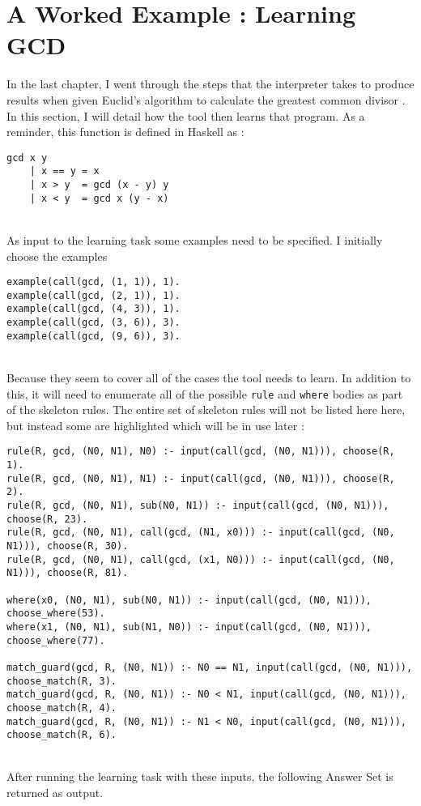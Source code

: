 \section{A Worked Example : Learning GCD}
In the last chapter, I went through the steps that the interpreter takes to produce results when given Euclid's algorithm to calculate the greatest common divisor \cite{Euclid}. In this section, I will detail how the tool then learns that program. As a reminder, this function is defined in Haskell as :

\begin{lstlisting}
gcd x y
	| x == y = x
	| x > y	 = gcd (x - y) y
	| x < y	 = gcd x (y - x)
\end{lstlisting}
\mbox{}\\
As input to the learning task some examples need to be specified. I initially choose the examples \\

\begin{lstlisting}
example(call(gcd, (1, 1)), 1).
example(call(gcd, (2, 1)), 1).
example(call(gcd, (4, 3)), 1).
example(call(gcd, (3, 6)), 3).
example(call(gcd, (9, 6)), 3).
\end{lstlisting}
\mbox{}\\
Because they seem to cover all of the cases the tool needs to learn. In addition to this, it will need to enumerate all of the possible \lstinline{rule} and \lstinline{where} bodies as part of the skeleton rules. The entire set of skeleton rules will not be listed here here, but instead some are highlighted which will be in use later : \\

\begin{lstlisting}
rule(R, gcd, (N0, N1), N0) :- input(call(gcd, (N0, N1))), choose(R, 1).
rule(R, gcd, (N0, N1), N1) :- input(call(gcd, (N0, N1))), choose(R, 2).
rule(R, gcd, (N0, N1), sub(N0, N1)) :- input(call(gcd, (N0, N1))), choose(R, 23).
rule(R, gcd, (N0, N1), call(gcd, (N1, x0))) :- input(call(gcd, (N0, N1))), choose(R, 30).
rule(R, gcd, (N0, N1), call(gcd, (x1, N0))) :- input(call(gcd, (N0, N1))), choose(R, 81).

where(x0, (N0, N1), sub(N0, N1)) :- input(call(gcd, (N0, N1))), choose_where(53).
where(x1, (N0, N1), sub(N1, N0)) :- input(call(gcd, (N0, N1))), choose_where(77).

match_guard(gcd, R, (N0, N1)) :- N0 == N1, input(call(gcd, (N0, N1))), choose_match(R, 3).
match_guard(gcd, R, (N0, N1)) :- N0 < N1, input(call(gcd, (N0, N1))), choose_match(R, 4).
match_guard(gcd, R, (N0, N1)) :- N1 < N0, input(call(gcd, (N0, N1))), choose_match(R, 6).
\end{lstlisting}
\mbox{}\\
After running the learning task with these inputs, the following Answer Set is returned as output. \\

